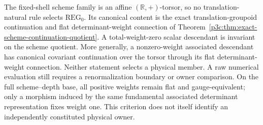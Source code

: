 \documentclass[12pt,a4paper]{article}
\begin{document}
The fixed-shell scheme family is an affine \((\mathbb R,+)\)-torsor, so no
translation-natural rule selects \(\mathrm{REG}_0\).  Its canonical content is
the exact translation-groupoid continuation and flat determinant-weight
connection of
Theorem~\ref{p3c:thm:exact-scheme-continuation-quotient}.  A total-weight-zero
scalar descendant is invariant on the scheme quotient.  More generally, a
nonzero-weight associated descendant has canonical covariant continuation
over the torsor through its flat determinant-weight connection.  Neither
statement selects a physical member.  A raw numerical evaluation still
requires a renormalization boundary or owner comparison.  On the full scheme--depth
base, all positive weights remain flat and gauge-equivalent; only a morphism
induced by the same fundamental associated determinant representation fixes
weight one.  This criterion does not itself identify an independently
constituted physical owner.



\printbibliography
\end{document}

